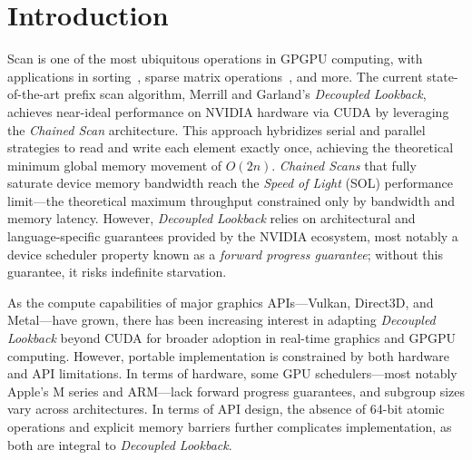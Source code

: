 \documentclass[sigconf]{acmart}
\begin{document}



\maketitle

\section{Introduction}
Scan is one of the most ubiquitous operations in GPGPU computing, with applications in sorting~\cite{adinets2022onesweepfastersignificantdigit}, sparse matrix operations~\cite{BellGarland2009}, and more. The current state-of-the-art prefix scan algorithm, Merrill and Garland's \emph{Decoupled Lookback}, achieves near-ideal performance on NVIDIA hardware via CUDA by leveraging the \emph{Chained Scan} architecture. This approach hybridizes serial and parallel strategies to read and write each element exactly once, achieving the theoretical minimum global memory movement of $O(2n)$. \emph{Chained Scans} that fully saturate device memory bandwidth reach the \emph{Speed of Light} (SOL) performance limit---the theoretical maximum throughput constrained only by bandwidth and memory latency. However, \emph{Decoupled Lookback} relies on architectural and language-specific guarantees provided by the NVIDIA ecosystem, most notably a device scheduler property known as a \emph{forward progress guarantee}; without this guarantee, it risks indefinite starvation.

As the compute capabilities of major graphics APIs---Vulkan, Direct3D, and Metal---have grown, there has been increasing interest in adapting \emph{Decoupled Lookback} beyond CUDA for broader adoption in real-time graphics and GPGPU computing. However, portable implementation is constrained by both hardware and API limitations. In terms of hardware, some GPU schedulers—most notably Apple’s M series and ARM—lack forward progress guarantees, and subgroup sizes vary across architectures. In terms of API design, the absence of 64-bit atomic operations and explicit memory barriers further complicates implementation, as both are integral to \emph{Decoupled Lookback}.
\end{document}
